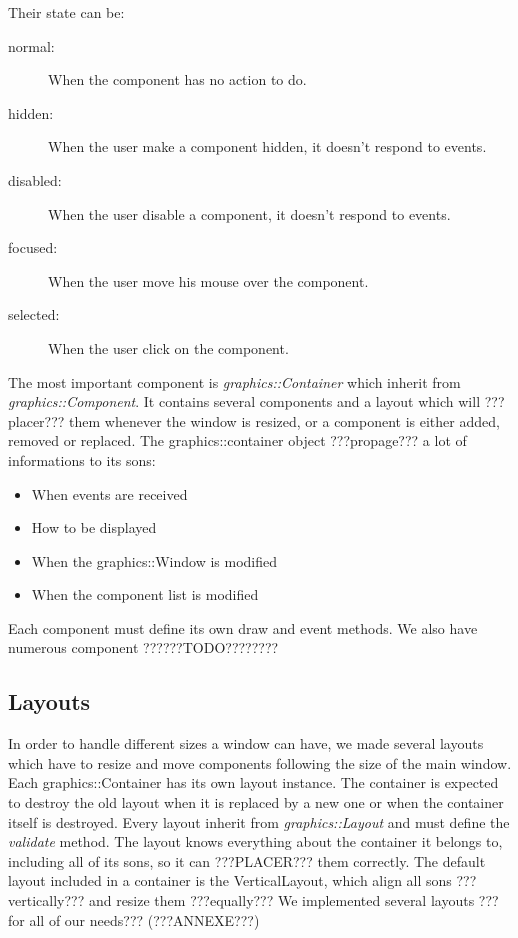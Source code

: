 \documentclass{scrreprt}
\begin{document}
		  Their state can be:
		  \begin{description}
		  \item[normal:]{When the component has no action to do.}
		  \item[hidden:]{When the user make a component hidden, it doesn't respond to events.}
		  \item[disabled:]{When the user disable a component, it doesn't respond to events.}
		  \item[focused:]{When the user move his mouse over the component.}
		  \item[selected:]{When the user click on the component.}
		  \end{description}

		  The most important component is \emph{graphics::Container} which inherit from \emph{graphics::Component}. It contains several components and a layout which will ???placer??? them whenever the window is resized, or a component is either added, removed or replaced. The graphics::container object ???propage??? a lot of informations to its sons:
		  \begin{itemize}
		  \item{When events are received}
		  \item{How to be displayed}
		  \item{When the graphics::Window is modified}
		  \item{When the component list is modified}
		  \end{itemize}

		  Each component must define its own draw and event methods.
		  We also have numerous component ??????TODO????????

		  \subsection{Layouts}
		  In order to handle different sizes a window can have, we made several layouts which have to resize and move components following the size of the main window. Each graphics::Container has its own layout instance. The container is expected to destroy the old layout when it is replaced by a new one or when the container itself is destroyed. Every layout inherit from \emph{graphics::Layout} and must define the \emph{validate} method. 
		  The layout knows everything about the container it belongs to, including all of its sons, so it can ???PLACER??? them correctly.
	The default layout included in a container is the VerticalLayout, which align all sons ???vertically??? and resize them ???equally???
We implemented several layouts ???for all of our needs??? (???ANNEXE???)
\end{document}
